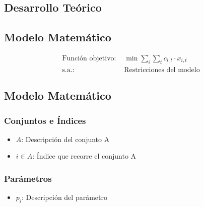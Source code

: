 \label{q:parteX-preguntaY}

\begin{center}
\end{center}

\vspace{0.5cm}

\answer

\subsection*{Desarrollo Teórico}

\subsection*{Modelo Matemático}

\begin{align}
    \text{Función objetivo: } & \min \sum_{i} \sum_{t} c_{i,t} \cdot x_{i,t} \\
    \text{s.a.: } & \text{Restricciones del modelo}
\end{align}
\subsection*{Modelo Matemático}

\subsubsection*{Conjuntos e Índices}
\begin{itemize}
    \item $A$: Descripción del conjunto A
    \item $i \in A$: Índice que recorre el conjunto A
\end{itemize}

\subsubsection*{Parámetros}
\begin{itemize}
    \item $p_i$: Descripción del parámetro
\end{itemize}

